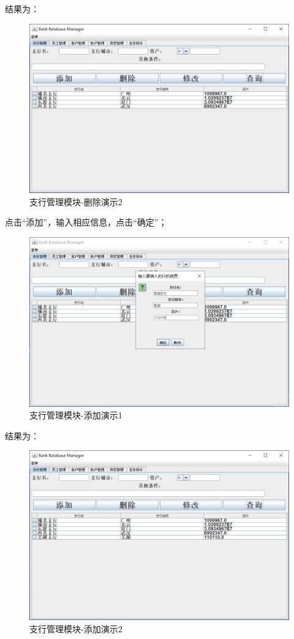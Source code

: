 \documentclass{ctexart}
\begin{document}
\par 
结果为：
\begin{figure}[H]
    \centering
    \includegraphics[scale=0.2]{zhgl5.png}
    \caption{支行管理模块-删除演示2}
\end{figure}
\par 
点击“添加”，输入相应信息，点击“确定”；
\begin{figure}[H]
    \centering
    \includegraphics[scale=0.2]{zhgl6.png}
    \caption{支行管理模块-添加演示1}
\end{figure}
\par 
结果为：
\begin{figure}[H]
    \centering
    \includegraphics[scale=0.2]{zhgl7.png}
    \caption{支行管理模块-添加演示2}
\end{figure}
\end{document}
